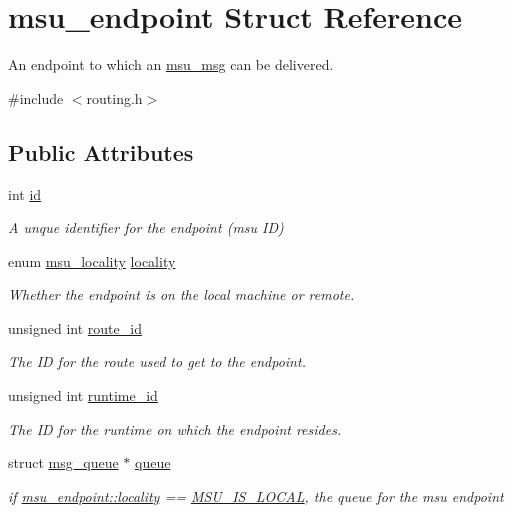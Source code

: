 \hypertarget{structmsu__endpoint}{\section{msu\-\_\-endpoint Struct Reference}
\label{structmsu__endpoint}
}


An endpoint to which an \hyperlink{structmsu__msg}{msu\-\_\-msg} can be delivered.  




{\ttfamily \#include $<$routing.\-h$>$}

\subsection*{Public Attributes}
\begin{DoxyCompactItemize}
\item 
int \hyperlink{structmsu__endpoint_ac80e655dbd6368c00945caf7de8e5a4b}{id}
\begin{DoxyCompactList}\small\item\em A unque identifier for the endpoint (msu I\-D) \end{DoxyCompactList}\item 
enum \hyperlink{dfg_8h_a97b014aefcfb738ba60c39a3bbd44c31}{msu\-\_\-locality} \hyperlink{structmsu__endpoint_aa06a2a0cc4c7ba40109635371acc8249}{locality}
\begin{DoxyCompactList}\small\item\em Whether the endpoint is on the local machine or remote. \end{DoxyCompactList}\item 
unsigned int \hyperlink{structmsu__endpoint_a8ffa7bacf8556511dc2d4129107d4868}{route\-\_\-id}
\begin{DoxyCompactList}\small\item\em The I\-D for the route used to get to the endpoint. \end{DoxyCompactList}\item 
unsigned int \hyperlink{structmsu__endpoint_aa0f75c3179e67f5f6b0edc166ebd3119}{runtime\-\_\-id}
\begin{DoxyCompactList}\small\item\em The I\-D for the runtime on which the endpoint resides. \end{DoxyCompactList}\item 
struct \hyperlink{structmsg__queue}{msg\-\_\-queue} $\ast$ \hyperlink{structmsu__endpoint_af1f7b343c89039de19431c0e620916b3}{queue}
\begin{DoxyCompactList}\small\item\em if \hyperlink{structmsu__endpoint_aa06a2a0cc4c7ba40109635371acc8249}{msu\-\_\-endpoint\-::locality} == \hyperlink{dfg_8h_a97b014aefcfb738ba60c39a3bbd44c31a28350aae24171519a7e1f4811f157298}{M\-S\-U\-\_\-\-I\-S\-\_\-\-L\-O\-C\-A\-L}, the queue for the msu endpoint \end{DoxyCompactList}\end{DoxyCompactItemize}


